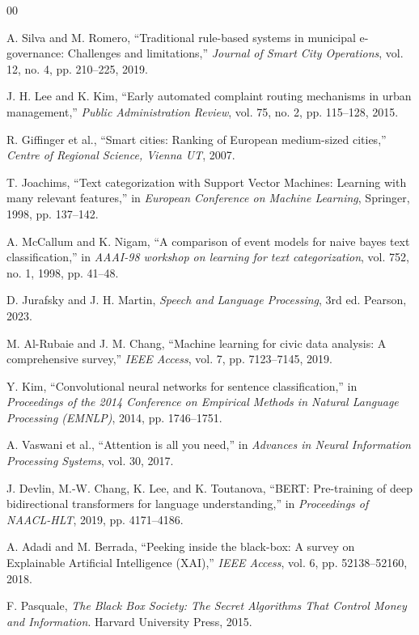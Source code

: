 \documentclass[conference]{IEEEtran}
\begin{document}
\begin{thebibliography}{00}

 A. Silva and M. Romero, ``Traditional rule-based systems in municipal e-governance: Challenges and limitations,'' \textit{Journal of Smart City Operations}, vol. 12, no. 4, pp. 210--225, 2019.

 J. H. Lee and K. Kim, ``Early automated complaint routing mechanisms in urban management,'' \textit{Public Administration Review}, vol. 75, no. 2, pp. 115--128, 2015.

 R. Giffinger et al., ``Smart cities: Ranking of European medium-sized cities,'' \textit{Centre of Regional Science, Vienna UT}, 2007.

 T. Joachims, ``Text categorization with Support Vector Machines: Learning with many relevant features,'' in \textit{European Conference on Machine Learning}, Springer, 1998, pp. 137--142.

 A. McCallum and K. Nigam, ``A comparison of event models for naive bayes text classification,'' in \textit{AAAI-98 workshop on learning for text categorization}, vol. 752, no. 1, 1998, pp. 41--48.

 D. Jurafsky and J. H. Martin, \textit{Speech and Language Processing}, 3rd ed. Pearson, 2023.

 M. Al-Rubaie and J. M. Chang, ``Machine learning for civic data analysis: A comprehensive survey,'' \textit{IEEE Access}, vol. 7, pp. 7123--7145, 2019.

 Y. Kim, ``Convolutional neural networks for sentence classification,'' in \textit{Proceedings of the 2014 Conference on Empirical Methods in Natural Language Processing (EMNLP)}, 2014, pp. 1746--1751.

 A. Vaswani et al., ``Attention is all you need,'' in \textit{Advances in Neural Information Processing Systems}, vol. 30, 2017.

 J. Devlin, M.-W. Chang, K. Lee, and K. Toutanova, ``BERT: Pre-training of deep bidirectional transformers for language understanding,'' in \textit{Proceedings of NAACL-HLT}, 2019, pp. 4171--4186.

 A. Adadi and M. Berrada, ``Peeking inside the black-box: A survey on Explainable Artificial Intelligence (XAI),'' \textit{IEEE Access}, vol. 6, pp. 52138--52160, 2018.

 F. Pasquale, \textit{The Black Box Society: The Secret Algorithms That Control Money and Information}. Harvard University Press, 2015.


\end{thebibliography}
\end{document}

